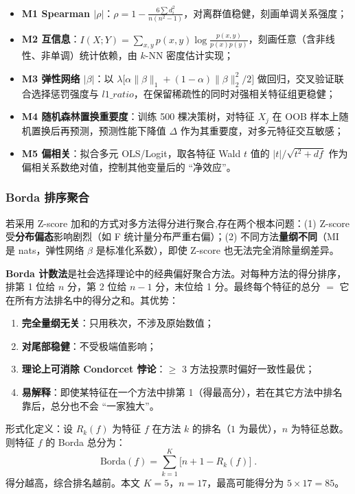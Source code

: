 \documentclass{MathorCupmodeling}
\providecommand{\tightlist}{%
  \setlength{\itemsep}{0pt}\setlength{\parskip}{0pt}}
\begin{document}
\begin{itemize}
\tightlist
\item \textbf{M1 Spearman $|\rho|$}：$\rho = 1 - \frac{6\sum d_i^2}{n(n^2-1)}$，对离群值稳健，刻画单调关系强度；
\item \textbf{M2 互信息}：$I(X; Y) = \sum_{x,y} p(x,y) \log \frac{p(x,y)}{p(x)p(y)}$，刻画任意（含非线性、非单调）统计依赖，由 $k$-NN 密度估计实现；
\item \textbf{M3 弹性网络 $|\beta|$}：以 $\lambda\bigl[\alpha\|\beta\|_1 + (1-\alpha)\|\beta\|_2^2/2\bigr]$ 做回归，交叉验证联合选择惩罚强度与 $l1\_ratio$，在保留稀疏性的同时对强相关特征组更稳健；
\item \textbf{M4 随机森林置换重要度}：训练 500 棵决策树，对特征 $X_j$ 在 OOB 样本上随机置换后再预测，预测性能下降值 $\Delta$ 作为其重要度，对多元特征交互敏感；
\item \textbf{M5 偏相关}：拟合多元 OLS/Logit，取各特征 Wald $t$ 值的 $|t|/\sqrt{t^2 + df}$ 作为偏相关系数绝对值，控制其他变量后的 ``净效应''。
\end{itemize}

\subsubsection{Borda 排序聚合}

若采用 Z-score 加和的方式对多方法得分进行聚合,存在两个根本问题：(1) Z-score 受\textbf{分布偏态}影响剧烈（如 F 统计量分布严重右偏）；(2) 不同方法\textbf{量纲不同}（MI 是 nats，弹性网络 $\beta$ 是标准化系数），即使 Z-score 也无法完全消除量纲差异。

\textbf{Borda 计数法}\cite{zhang-borda-2020}是社会选择理论中的经典偏好聚合方法。对每种方法的得分排序，排第 1 位给 $n$ 分，第 2 位给 $n-1$ 分，末位给 1 分。最终每个特征的总分 $=$ 它在所有方法排名中的得分之和。其优势：

\begin{enumerate}
\def\labelenumi{(\arabic{enumi})}
\tightlist
\item \textbf{完全量纲无关}：只用秩次，不涉及原始数值；
\item \textbf{对尾部稳健}：不受极端值影响；
\item \textbf{理论上可消除 Condorcet 悖论}：$\ge$ 3 方法投票时偏好一致性最优；
\item \textbf{易解释}：即使某特征在一个方法中排第 1（得最高分），若在其它方法中排名靠后，总分也不会 ``一家独大''。
\end{enumerate}

形式化定义：设 $R_k(f)$ 为特征 $f$ 在方法 $k$ 的排名（$1$ 为最优），$n$ 为特征总数。则特征 $f$ 的 Borda 总分为：
\[
\text{Borda}(f) = \sum_{k=1}^{K} \bigl[ n + 1 - R_k(f) \bigr] \;.
\]
得分越高，综合排名越前。本文 $K=5$，$n=17$，最高可能得分为 $5 \times 17 = 85$。
\end{document}
